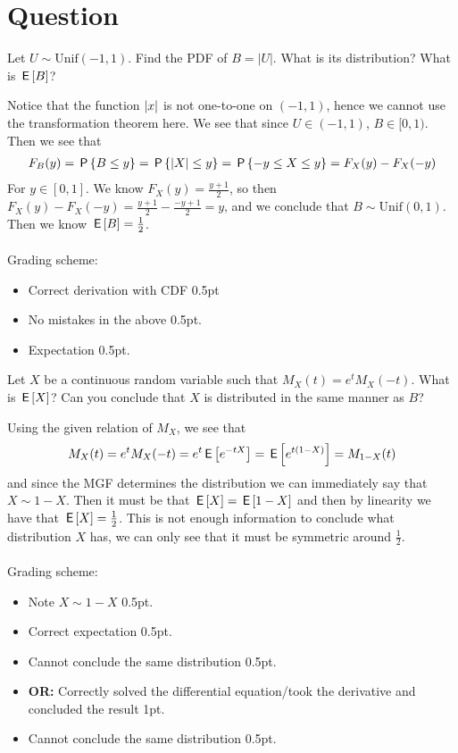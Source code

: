 \section{Question}
\begin{exercise}[1.5]
Let $U\sim\text{Unif}(-1,1)$. Find the PDF of $B = \left|U\right|$. What is its distribution? What is $\,\mathsf{E}\left[B\right]$?
\begin{solution}
Notice that the function $\left\vert x\right\vert$ is not one-to-one on $(-1,1)$, hence we cannot use the transformation theorem here. We see that since $U\in(-1,1)$, $B\in[0,1)$. Then we see that
\begin{align*}
    F_B(y) = \,\mathsf{P}\left\{B\leq y\right\} = \,\mathsf{P}\left\{\left\vert X\right\vert\leq y\right\} = \,\mathsf{P}\left\{-y\leq X \leq y\right\} = F_X(y) - F_X(-y)
\end{align*}
For $y\in[0,1]$. We know $F_X(y) = \frac{y+1}{2}$, so then $F_X(y) - F_X(-y) = \frac{y+1}{2} - \frac{-y+1}{2} = y$, and we conclude that $B\sim\text{Unif}(0,1)$. Then we  know $\,\mathsf{E}\left[B\right] = \frac12$.
\\\\
Grading scheme:
\begin{itemize}
    \item Correct derivation with CDF 0.5pt
    \item No mistakes in the above 0.5pt.
    \item Expectation 0.5pt.
\end{itemize}
\end{solution}
\end{exercise}

\begin{exercise}[1.5]
Let $X$ be a continuous random variable such that $M_X(t) = e^t M_X(-t)$. What is $\,\mathsf{E}\left[X\right]$? Can you conclude that $X$ is distributed in the same manner as $B$?
\begin{solution}
Using the given relation of $M_X$, we see that
\begin{align*}
    M_X(t) = e^t M_X(-t) = e^t\,\mathsf{E}\left[e^{-t X}\right] = \,\mathsf{E}\left[e^{t(1-X)}\right] = M_{1-X}(t)
\end{align*}
and since the MGF determines the distribution we can immediately say that $X\sim 1-X$. Then it must be that $\,\mathsf{E}\left[X\right] = \,\mathsf{E}\left[1-X\right]$ and then by linearity we have that $\,\mathsf{E}\left[X\right] = \frac12$. This is not enough information to conclude what distribution $X$ has, we can only see that it must be symmetric around $\frac12$.
\\\\
Grading scheme:
\begin{itemize}
    \item Note $X\sim1-X$ 0.5pt.
    \item Correct expectation 0.5pt.
    \item Cannot conclude the same distribution 0.5pt.
    \item \textbf{OR:} Correctly solved the differential equation/took the derivative and concluded the result 1pt.
    \item Cannot conclude the same distribution 0.5pt.
\end{itemize}
\end{solution}
\end{exercise}

